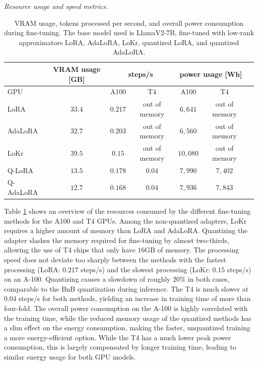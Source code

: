 \documentclass[conference]{IEEEtran}
\begin{document}
\emph{Resource usage and speed metrics.} 
\begin{table}
\caption{VRAM usage, tokens processed per second, and overall power consumption during fine-tuning. The base model used is LlamaV2-7B, fine-tuned with low-rank approximators LoRA, AdaLoRA, LoKr, quantized LoRA, and quantized AdaLoRA.}
\label{tab:finetune_metrics}
\centering
\begin{tabular}{lcccccc}
                & VRAM usage [GB]  & \multicolumn{2}{c}{steps/s} & \multicolumn{2}{c}{power usage [Wh]}  \\  \hline
GPU             &      & A100  & T4  & A100  & T4 \\ \hline
LoRA            &  $33.4$  & $0.217$ & out of memory & $6,641$ & out of memory \\   
AdaLoRA         &  $32.7$ & $0.203$ & out of memory &  $6,560$ & out of memory \\   
LoKr            &  $39.5$ & $0.15$  & out of memory &  $10,080$ & out of memory \\
Q-LoRA          &  $13.5$ & $0.178$ & $0.04$ &  $7,990$ & $7,402$ \\ 
Q-AdaLoRA       &  $12.7$ & $0.168$ & $0.04$ &  $7,936$ & $7,843$ \\ \hline            
\end{tabular}
\end{table}
%
Table \ref{tab:finetune_metrics} shows an overview of the resources consumed by the different fine-tuning methods for the A100 and T4 GPUs. Among the non-quantized adapters, LoKr requires a higher amount of memory than LoRA and AdaLoRA. Quantizing the adapter slashes the memory required for fine-tuning by almost two-thirds, allowing the use of T4 chips that only have $16$GB of memory. The processing speed does not deviate too sharply between the methods with the fastest processing (LoRA: $0.217$ steps/s) and the slowest processing (LoKr: $0.15$ steps/s) on an A-100. Quantizing causes a slowdown of roughly $20\%$ in both cases, comparable to the BnB quantization during inference. The T4 is much slower at $0.04$ steps/s for both methods,  yielding an increase in training time of more than four-fold. The overall power consumption on the A-100 is highly correlated with the training time, while the reduced memory usage of the quantized methods has a slim effect on the energy consumption, making the faster, unquantized training a more energy-efficient option. While the T4 has a much lower peak power consumption, this is largely compensated by longer training time, leading to similar energy usage for both GPU models.
\end{document}
